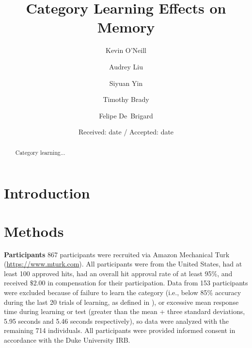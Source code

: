 \documentclass[twocolumn]{svjour3}          %
\begin{document}
\title{Category Learning Effects on Memory
}


\author{Kevin O'Neill \and Audrey Liu \and Siyuan Yin \and Timothy Brady \and Felipe De~Brigard}


\date{Received: date / Accepted: date}


\maketitle

\begin{abstract}
Category learning...
\end{abstract}

\section*{Introduction}
\label{intro}

\section*{Methods}
\label{methods}

\textbf{Participants }
867 participants were recruited via Amazon Mechanical Turk
(\url{https://www.mturk.com}). All participants were from the United
States, had at least 100 approved hits, had an overall hit approval
rate of at least 95\%, and received $\$2.00$ in compensation for their
participation. Data from 153 participants were excluded because of
failure to learn the category (i.e., below 85\% accuracy during the
last 20 trials of learning, as defined in \cite{DeBrigard2017}), or
excessive mean response time during learning or test (greater than the
mean + three standard deviations, 5.95 seconds and 5.46 seconds
respectively), so data were analyzed with the remaining 714
individuals. All participants were provided informed consent in
accordance with the Duke University IRB.
\end{document}
